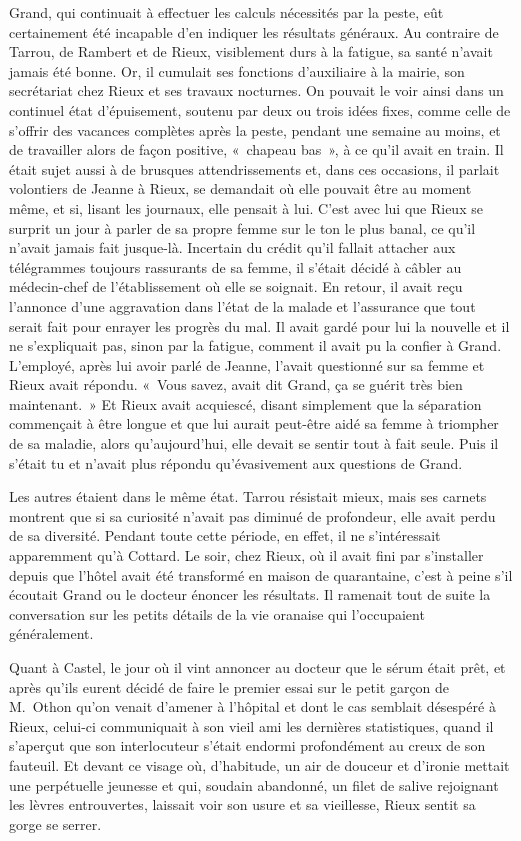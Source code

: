 \documentclass[french,twoside]{book} %
\begin{document}
Grand, qui continuait à effectuer les calculs nécessités par la peste, eût certainement été incapable d’en indiquer les résultats généraux. Au contraire de Tarrou, de Rambert et de Rieux, visiblement durs à la fatigue, sa santé n’avait jamais été bonne. Or, il cumulait ses fonctions d’auxiliaire à la mairie, son secrétariat chez Rieux et ses travaux nocturnes. On pouvait le voir ainsi dans un continuel état d’épuisement, soutenu par deux ou trois idées fixes, comme celle de s’offrir des vacances complètes après la peste, pendant une semaine au moins, et de travailler alors de façon positive, « chapeau bas », à ce qu’il avait en train. Il était sujet aussi à de brusques attendrissements et, dans ces occasions, il parlait volontiers de Jeanne à Rieux, se demandait où elle pouvait être au moment même, et si, lisant les journaux, elle pensait à lui. C’est avec lui que Rieux se surprit un jour à parler de sa propre femme sur le ton le plus banal, ce qu’il n’avait jamais fait jusque-là. Incertain du crédit qu’il fallait attacher aux télégrammes toujours rassurants de sa femme, il s’était décidé à câbler au médecin-chef de l’établissement où elle se soignait. En retour, il avait reçu l’annonce d’une aggravation dans l’état de la malade et l’assurance que tout serait fait pour enrayer les progrès du mal. Il avait gardé pour lui la nouvelle et il ne s’expliquait pas, sinon par la fatigue, comment il avait pu la confier à Grand. L’employé, après lui avoir parlé de Jeanne, l’avait questionné sur sa femme et Rieux avait répondu. « Vous savez, avait dit Grand, ça se guérit très bien maintenant. » Et Rieux avait acquiescé, disant simplement que la séparation commençait à être longue et que lui aurait peut-être aidé sa femme à triompher de sa maladie, alors qu’aujourd’hui, elle devait se sentir tout à fait seule. Puis il s’était tu et n’avait plus répondu qu’évasivement aux questions de Grand.\par
Les autres étaient dans le même état. Tarrou résistait mieux, mais ses carnets montrent que si sa curiosité n’avait pas diminué de profondeur, elle avait perdu de sa diversité. Pendant toute cette période, en effet, il ne s’intéressait apparemment qu’à Cottard. Le soir, chez Rieux, où il avait fini par s’installer depuis que l’hôtel avait été transformé en maison de quarantaine, c’est à peine s’il écoutait Grand ou le docteur énoncer les résultats. Il ramenait tout de suite la conversation sur les petits détails de la vie oranaise qui l’occupaient généralement.\par
Quant à Castel, le jour où il vint annoncer au docteur que le sérum était prêt, et après qu’ils eurent décidé de faire le premier essai sur le petit garçon de M. Othon qu’on venait d’amener à l’hôpital et dont le cas semblait désespéré à Rieux, celui-ci communiquait à son vieil ami les dernières statistiques, quand il s’aperçut que son interlocuteur s’était endormi profondément au creux de son fauteuil. Et devant ce visage où, d’habitude, un air de douceur et d’ironie mettait une perpétuelle jeunesse et qui, soudain abandonné, un filet de salive rejoignant les lèvres entrouvertes, laissait voir son usure et sa vieillesse, Rieux sentit sa gorge se serrer.\par
\end{document}
